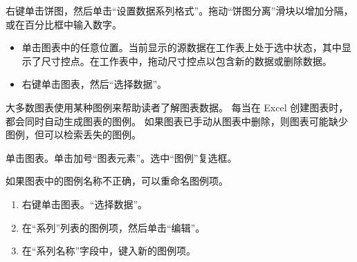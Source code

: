 右键单击饼图，然后单击“设置数据系列格式”。拖动“饼图分离”滑块以增加分隔，或在百分比框中输入数字。

{\bfseries {}}

\begin{itemize}
    \item 单击图表中的任意位置。当前显示的源数据在工作表上处于选中状态，其中显示了尺寸控点。在工作表中，拖动尺寸控点以包含新的数据或删除数据。
    \item 右键单击图表，然后“选择数据”。
\end{itemize}

{\bfseries {}}

大多数图表使用某种图例来帮助读者了解图表数据。 每当在 Excel 创建图表时，都会同时自动生成图表的图例。 如果图表已手动从图表中删除，则图表可能缺少图例，但可以检索丢失的图例。

单击图表。单击加号“图表元素”。选中“图例”复选框。

{\bfseries {}}

如果图表中的图例名称不正确，可以重命名图例项。

\begin{enumerate}
    \item 右键单击图表。“选择数据”。
    \item 在“系列”列表的图例项，然后单击“编辑”。
    \item 在“系列名称”字段中，键入新的图例项。
\end{enumerate}



